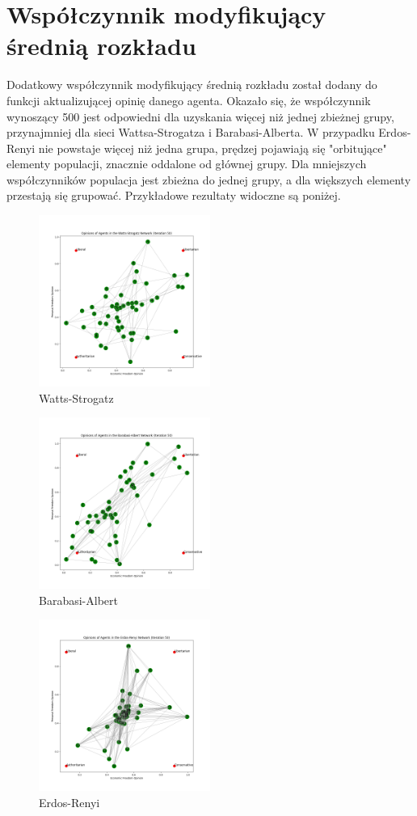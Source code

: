 \section{Współczynnik modyfikujący średnią rozkładu}

Dodatkowy współczynnik modyfikujący średnią rozkładu został dodany do funkcji aktualizującej opinię danego agenta.
Okazało się, że współczynnik wynoszący 500 jest odpowiedni dla uzyskania więcej niż jednej zbieżnej grupy, przynajmniej dla sieci Wattsa-Strogatza i Barabasi-Alberta.
W przypadku Erdos-Renyi nie powstaje więcej niż jedna grupa, prędzej pojawiają się "orbitujące" elementy populacji, znacznie oddalone od głównej grupy.
Dla mniejszych współczynników populacja jest zbieżna do jednej grupy, a dla większych elementy przestają się grupować.
Przykładowe rezultaty widoczne są poniżej.

\begin{figure}
    \centering
    \includegraphics[width=0.5\textwidth]{img/Watts-Strogatz.png}
    \caption{Watts-Strogatz}
    \label{fig:Watts-Strogatz}
\end{figure}

\begin{figure}
    \centering
    \includegraphics[width=0.5\textwidth]{img/Barabasi-Albert.png}
    \caption{Barabasi-Albert}
    \label{fig:Barabasi-Albert}
\end{figure}

\begin{figure}
    \centering
    \includegraphics[width=0.5\textwidth]{img/Erdos-Renyi.png}
    \caption{Erdos-Renyi}
    \label{fig:Erdos-Renyi}
\end{figure}
